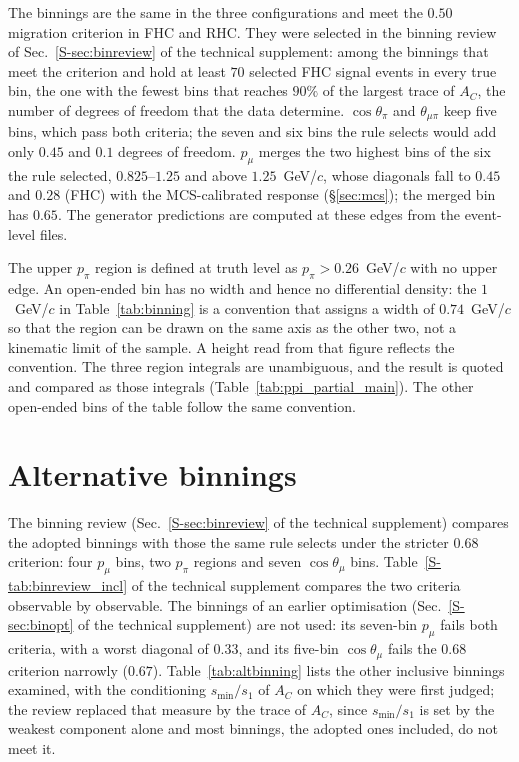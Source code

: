 \documentclass[11pt,a4paper]{article}
\newcommand{\suppref}[2]{#1~\ref{S-#2} of the technical supplement}
\begin{document}
 The binnings are the same in the three configurations and meet the $0.50$
migration criterion in FHC and RHC. They were selected in the binning review of
\suppref{Sec.}{sec:binreview}: among the binnings that meet the criterion and hold at least $70$
selected FHC signal events in every true bin, the one with the
fewest bins that reaches $90\%$ of the largest trace of $A_C$, the number of degrees of freedom that
the data determine. $\cos\theta_\pi$ and $\theta_{\mu\pi}$ keep five bins, which pass both
criteria; the seven and six bins the rule selects would add only $0.45$ and $0.1$ degrees of
freedom. $p_\mu$ merges the two highest bins of the six the rule selected, $0.825$--$1.25$ and above
$1.25$~GeV/$c$, whose diagonals fall to $0.45$ and $0.28$ (FHC) with the MCS-calibrated response
(\S\ref{sec:mcs}); the merged bin has $0.65$. The generator predictions are computed at these edges from the event-level files.



The upper $p_\pi$ region is defined at truth level as $p_\pi>0.26$~GeV/$c$ with no upper edge. An
open-ended bin has no width and hence no differential density: the $1$~GeV/$c$ in
Table~\ref{tab:binning} is a convention that assigns a width of $0.74$~GeV/$c$ so that the region can
be drawn on the same axis as the other two, not a kinematic limit of the sample. A height read from
that figure reflects the convention. The three region integrals are unambiguous, and the result is
quoted and compared as those integrals (Table~\ref{tab:ppi_partial_main}). The other open-ended bins
of the table follow the same convention.

\section{Alternative binnings}
\label{app:altbinning}

The binning review (\suppref{Sec.}{sec:binreview}) compares the adopted binnings with those the same
rule selects under the stricter $0.68$ criterion: four $p_\mu$ bins, two $p_\pi$ regions and seven
$\cos\theta_\mu$ bins. \suppref{Table}{tab:binreview_incl} compares the two criteria observable by observable. The binnings of an earlier
optimisation (\suppref{Sec.}{sec:binopt}) are not used: its seven-bin $p_\mu$ fails both criteria,
with a worst diagonal of $0.33$, and its five-bin $\cos\theta_\mu$ fails the $0.68$ criterion
narrowly ($0.67$). Table~\ref{tab:altbinning} lists the other inclusive binnings examined, with the
conditioning $s_{\min}/s_1$ of $A_C$ on which they were first judged; the review replaced that
measure by the trace of $A_C$, since $s_{\min}/s_1$ is set by the weakest component alone and most
binnings, the adopted ones included, do not meet it.
\end{document}
